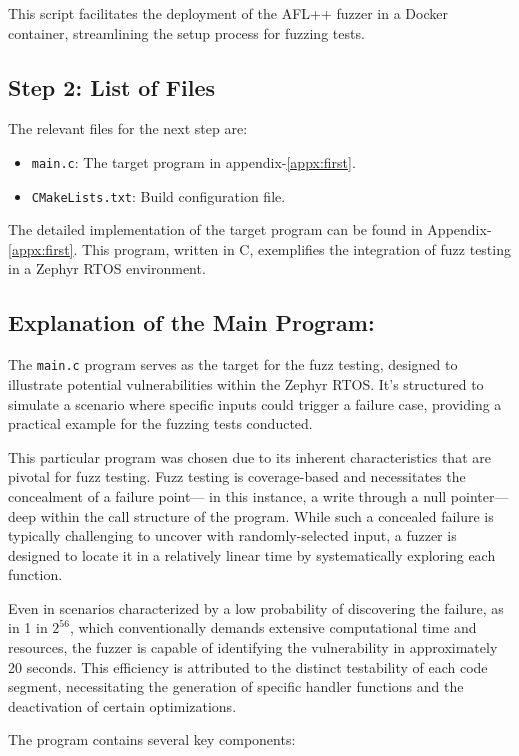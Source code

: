 This script facilitates the deployment of the AFL++ fuzzer in a Docker container,
streamlining the setup process for fuzzing tests.

\subsection*{Step 2: List of Files}
The relevant files for the next step are:
\begin{itemize}
    \item \texttt{main.c}: The target program in appendix-\ref{appx:first}.
    \item \texttt{CMakeLists.txt}: Build configuration file.
\end{itemize}

The detailed implementation of the target program can be
found in Appendix-\ref{appx:first}. This program, written
in C, exemplifies the integration of fuzz testing in a Zephyr RTOS environment.

\subsection*{Explanation of the Main Program:}
The \texttt{main.c} program serves as the target for the fuzz testing,
designed to illustrate potential vulnerabilities within the Zephyr RTOS.
It's structured to simulate a scenario where specific inputs could trigger a
failure case, providing a practical example for the fuzzing tests conducted.

This particular program was chosen due to its inherent characteristics that
are pivotal for fuzz testing. Fuzz testing is coverage-based and necessitates
the concealment of a failure point— in this instance, a write through a null
pointer—deep within the call structure of the program. While such a concealed
failure is typically challenging to uncover with randomly-selected input,
a fuzzer is designed to locate it in a relatively linear time by systematically
exploring each function.

Even in scenarios characterized by a low probability of discovering the failure,
as in 1 in \(2^{56}\), which conventionally demands extensive computational
time and resources, the fuzzer is capable of identifying the vulnerability in
approximately 20 seconds. This efficiency is attributed to the distinct
testability of each code segment, necessitating the generation of specific
handler functions and the deactivation of certain optimizations.

The program contains several key components:

